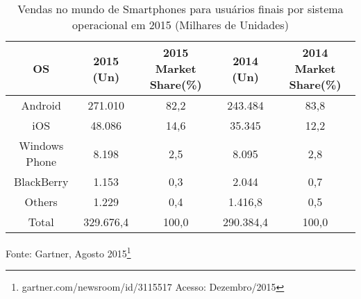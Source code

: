 \begin{table}[!htb]
	\centering
	\label{tab:OS}
	\begin{tabular}{c|c|c|c|c}
		\hline \SPACE
		\textbf{OS} & \textbf{2015 (Un)}  & \textbf{2015 Market Share(\%)}  & \textbf{2014 (Un)}  & \textbf{2014 Market Share(\%)} \\ \hline \SPACE
		Android & 271.010 & 82,2 & 243.484 & 83,8\\ \hline \SPACE
		iOS & 48.086 & 14,6 & 35.345 & 12,2\\ \hline \SPACE
		Windows Phone & 8.198 & 2,5 & 8.095 & 2,8\\ \hline \SPACE
		BlackBerry & 1.153 & 0,3 & 2.044 & 0,7\\ \hline \SPACE
		Others & 1.229 & 0,4 & 1.416,8 & 0,5\\ \hline \SPACE
		Total & 329.676,4 & 100,0 & 290.384,4 & 100,0\\
		\hline
	\end{tabular}
	\caption[Sistemas operacionais mais utilizados]{Vendas no mundo de Smartphones para usuários finais por sistema operacional em 2015 (Milhares de Unidades)}
\end{table}\vspace{-1cm}
\begin{center}
	\small
	{Fonte: Gartner, Agosto 2015\footnote{gartner.com/newsroom/id/3115517 Acesso: Dezembro/2015}}
\end{center}